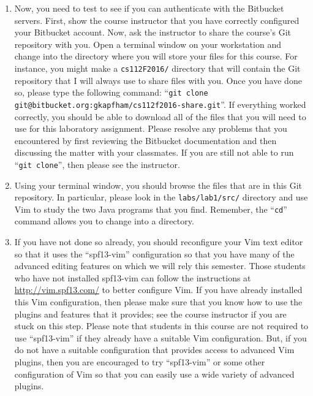 \begin{enumerate}
  \item Now, you need to test to see if you can authenticate with the Bitbucket servers.  First, show the course
    instructor that you have correctly configured your Bitbucket account.  Now, ask the instructor to share the course's
    Git repository with you.  Open a terminal window on your workstation and change into the directory where you will
    store your files for this course.  For instance, you might make a {\tt cs112F2016/} directory that will contain the
    Git repository that I will always use to share files with you.  Once you have done so, please type the following
    command: ``{\tt git clone git@bitbucket.org:gkapfham/cs112f2016-share.git}''.  If everything worked correctly, you
    should be able to download all of the files that you will need to use for this laboratory assignment. Please resolve
    any problems that you encountered by first reviewing the Bitbucket documentation and then discussing the matter
    with your classmates. If you are still not able to run ``{\tt git clone}'', then please see the instructor.

  \item Using your terminal window, you should browse the files that are in this Git repository.  In particular, please
    look in the {\tt labs/lab1/src/} directory and use Vim to study the two Java programs that you find.  Remember, the
    ``{\tt cd}'' command allows you to change into a directory.

  \item If you have not done so already, you should reconfigure your Vim text editor so that it uses the ``spf13-vim''
    configuration so that you have many of the advanced editing features on which we will rely this semester. Those
    students who have not installed spf13-vim can follow the instructions at \url{http://vim.spf13.com/} to better
    configure Vim. If you have already installed this Vim configuration, then please make sure that you know how to use
    the plugins and features that it provides; see the course instructor if you are stuck on this step. Please note that
    students in this course are not required to use ``spf13-vim'' if they already have a suitable Vim configuration.
    But, if you do not have a suitable configuration that provides access to advanced Vim plugins, then you are
    encouraged to try ``spf13-vim'' or some other configuration of Vim so that you can easily use a wide variety of
    advanced plugins.

\end{enumerate}

